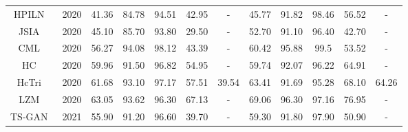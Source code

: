 \documentclass[journal]{IEEEtran}
\begin{document}
\begin{table*}[]
\begin{tabular}{c|c|ccccc|ccccc}
		HPILN~\cite{zhao2019hpiln}                    & 2020                  & 41.36                       & 84.78                        & 94.51                        & 42.95                    & -              & 45.77                       & 91.82                        & 98.46                        & 56.52                    & -              \\
		JSIA~\cite{wang2020cross}                     & 2020                  & 45.10                       & 85.70                        & 93.80                        & 29.50                    & -              & 52.70                       & 91.10                        & 96.40                        & 42.70                    & -              \\
		CML~\cite{ling2020class}                      & 2020                  & 56.27                       & 94.08                        & 98.12                        & 43.39                    & -              & 60.42                       & 95.88                        & 99.5                         & 53.52                    & -              \\
		HC~\cite{zhu2020hetero}                       & 2020                  & 59.96                       & 91.50                        & 96.82                        & 54.95                    & -              & 59.74                       & 92.07                        & 96.22                        & 64.91                    & -              \\
		HcTri~\cite{liu2020parameter}                    & 2020                  & 61.68                       & 93.10                        & 97.17                        & 57.51                    & 39.54          & 63.41                       & 91.69                        & 95.28                        & 68.10                    & 64.26          \\
		LZM~\cite{basaran2020efficient}                       & 2020                  & 63.05                       & 93.62                        & 96.30                        & 67.13                    & -              & 69.06                       & 96.30                        & 97.16                        & 76.95                    & -              \\ \hline
		TS-GAN~\cite{zhang2021rgb}                    & 2021                  & 55.90                       & 91.20                        & 96.60                        & 39.70                    & -              & 59.30                       & 91.80                        & 97.90                        & 50.90                    & -              \\

\end{tabular}
\end{table*}
\end{document}
